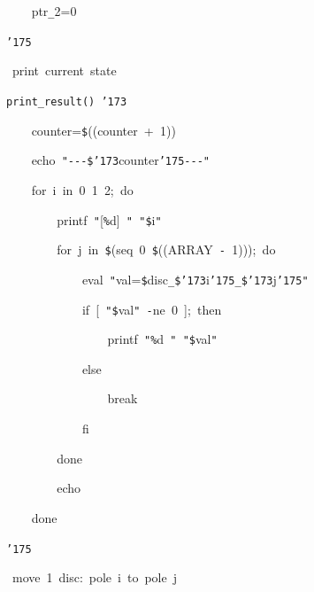 \documentclass{article}
\begin{document}
\noindent
\mbox{}{\tt\mc \ \ \ \ }ptr{\tt\_}2=0

\noindent
\mbox{}{\tt\char'175}

\noindent
\mbox{}\hfill

\noindent
\mbox{}\rm\mc {\tt\#}\ print\ current\ state

\noindent
\mbox{}\tt\mc print{\tt\_}result(){\tt\mc \ }{\tt\char'173}

\noindent
\mbox{}{\tt\mc \ \ \ \ }counter={\tt\$}((counter{\tt\mc \ }+{\tt\mc \ }1))

\noindent
\mbox{}{\tt\mc \ \ \ \ }echo{\tt\mc \ }{\tt "}{\tt -}{\tt -}{\tt -}{\tt\$}{\tt\char'173}counter{\tt\char'175}{\tt -}{\tt -}{\tt -}{\tt "}

\noindent
\mbox{}{\tt\mc \ \ \ \ }for{\tt\mc \ }i{\tt\mc \ }in{\tt\mc \ }0{\tt\mc \ }1{\tt\mc \ }2;{\tt\mc \ }do

\noindent
\mbox{}{\tt\mc \ \ \ \ \ \ \ \ }printf{\tt\mc \ }{\tt "}[{\tt\%}d]{\tt\mc \ }{\tt "}{\tt\mc \ }{\tt "}{\tt\$}i{\tt "}

\noindent
\mbox{}{\tt\mc \ \ \ \ \ \ \ \ }for{\tt\mc \ }j{\tt\mc \ }in{\tt\mc \ }{\tt\$}(seq{\tt\mc \ }0{\tt\mc \ }{\tt\$}((ARRAY{\tt\mc \ }{\tt -}{\tt\mc \ }1)));{\tt\mc \ }do

\noindent
\mbox{}{\tt\mc \ \ \ \ \ \ \ \ \ \ \ \ }eval{\tt\mc \ }{\tt "}val={\tt{}}{\tt\$}disc{\tt\_}{\tt\$}{\tt\char'173}i{\tt\char'175}{\tt\_}{\tt\$}{\tt\char'173}j{\tt\char'175}{\tt "}

\noindent
\mbox{}{\tt\mc \ \ \ \ \ \ \ \ \ \ \ \ }if{\tt\mc \ }[{\tt\mc \ }{\tt "}{\tt\$}val{\tt "}{\tt\mc \ }{\tt -}ne{\tt\mc \ }0{\tt\mc \ }];{\tt\mc \ }then

\noindent
\mbox{}{\tt\mc \ \ \ \ \ \ \ \ \ \ \ \ \ \ \ \ }printf{\tt\mc \ }{\tt "}{\tt\%}d{\tt\mc \ }{\tt "}{\tt\mc \ }{\tt "}{\tt\$}val{\tt "}

\noindent
\mbox{}{\tt\mc \ \ \ \ \ \ \ \ \ \ \ \ }else

\noindent
\mbox{}{\tt\mc \ \ \ \ \ \ \ \ \ \ \ \ \ \ \ \ }break

\noindent
\mbox{}{\tt\mc \ \ \ \ \ \ \ \ \ \ \ \ }fi

\noindent
\mbox{}{\tt\mc \ \ \ \ \ \ \ \ }done

\noindent
\mbox{}{\tt\mc \ \ \ \ \ \ \ \ }echo

\noindent
\mbox{}{\tt\mc \ \ \ \ }done

\noindent
\mbox{}{\tt\char'175}

\noindent
\mbox{}\hfill

\noindent
\mbox{}\rm\mc {\tt\#}\ move\ 1\ disc:\ pole\ i\ to\ pole\ j
\end{document}
